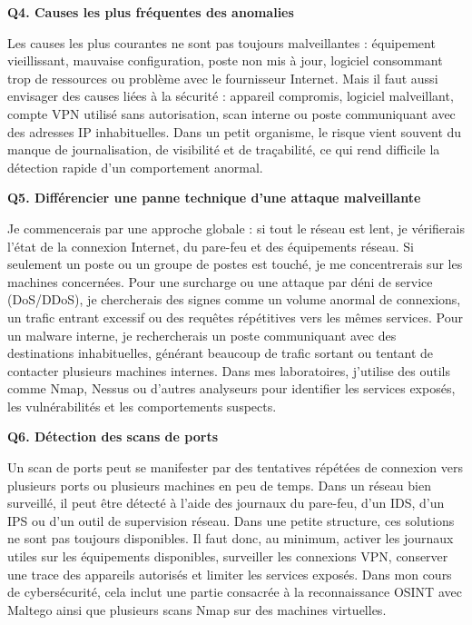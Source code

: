 \documentclass[12pt,a4paper]{article}
\begin{document}
\bigskip
\textbf{Q4. Causes les plus fr\'{e}quentes des anomalies}

Les causes les plus courantes ne sont pas toujours malveillantes : \'{e}quipement vieillissant,
mauvaise configuration, poste non mis \`{a} jour, logiciel consommant trop de ressources ou
probl\`{e}me avec le fournisseur Internet. Mais il faut aussi envisager des causes li\'{e}es \`{a} la
s\'{e}curit\'{e} : appareil compromis, logiciel malveillant, compte VPN utilis\'{e} sans autorisation, scan
interne ou poste communiquant avec des adresses IP inhabituelles. Dans un petit organisme,
le risque vient souvent du manque de journalisation, de visibilit\'{e} et de tra\c{c}abilit\'{e}, ce qui rend
difficile la d\'{e}tection rapide d'un comportement anormal.

\bigskip
\textbf{Q5. Diff\'{e}rencier une panne technique d'une attaque malveillante}

Je commencerais par une approche globale : si tout le r\'{e}seau est lent, je v\'{e}rifierais l'\'{e}tat de
la connexion Internet, du pare-feu et des \'{e}quipements r\'{e}seau. Si seulement un poste ou un
groupe de postes est touch\'{e}, je me concentrerais sur les machines concern\'{e}es. Pour une
surcharge ou une attaque par d\'{e}ni de service (DoS/DDoS), je chercherais des signes comme
un volume anormal de connexions, un trafic entrant excessif ou des requ\^{e}tes r\'{e}p\'{e}titives vers
les m\^{e}mes services. Pour un malware interne, je rechercherais un poste communiquant avec
des destinations inhabituelles, g\'{e}n\'{e}rant beaucoup de trafic sortant ou tentant de contacter
plusieurs machines internes. Dans mes laboratoires, j'utilise des outils comme Nmap, Nessus
ou d'autres analyseurs pour identifier les services expos\'{e}s, les vuln\'{e}rabilit\'{e}s et les
comportements suspects.

\bigskip
\textbf{Q6. D\'{e}tection des scans de ports}

Un scan de ports peut se manifester par des tentatives r\'{e}p\'{e}t\'{e}es de connexion vers plusieurs
ports ou plusieurs machines en peu de temps. Dans un r\'{e}seau bien surveill\'{e}, il peut \^{e}tre
d\'{e}tect\'{e} \`{a} l'aide des journaux du pare-feu, d'un IDS, d'un IPS ou d'un outil de supervision
r\'{e}seau. Dans une petite structure, ces solutions ne sont pas toujours disponibles. Il faut donc,
au minimum, activer les journaux utiles sur les \'{e}quipements disponibles, surveiller les
connexions VPN, conserver une trace des appareils autoris\'{e}s et limiter les services expos\'{e}s.
Dans mon cours de cybers\'{e}curit\'{e}, cela inclut une partie consacr\'{e}e \`{a} la reconnaissance
OSINT avec Maltego ainsi que plusieurs scans Nmap sur des machines virtuelles.
\end{document}
